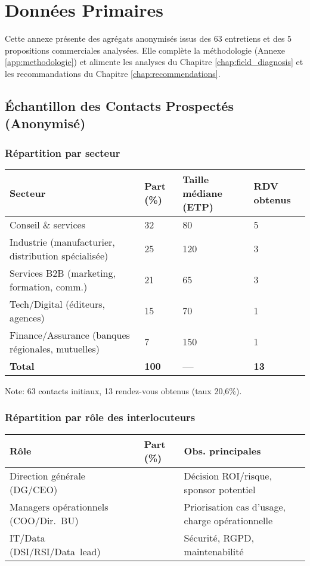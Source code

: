 \chapter{Données Primaires}
\label{app:data}

Cette annexe présente des agrégats anonymisés issus des 63 entretiens et des 5 propositions commerciales analysées. Elle complète la méthodologie (Annexe \ref{app:methodologie}) et alimente les analyses du Chapitre \ref{chap:field_diagnosis} et les recommandations du Chapitre \ref{chap:recommendations}.

\section{Échantillon des Contacts Prospectés (Anonymisé)}
\subsection{Répartition par secteur}
\begin{longtable}{@{}p{6cm}p{3cm}p{3cm}p{3cm}@{}}
\toprule
\textbf{Secteur} & \textbf{Part (\%)} & \textbf{Taille médiane (ETP)} & \textbf{RDV obtenus} \\
\midrule
Conseil \& services & 32 & 80 & 5 \\
Industrie (manufacturier, distribution spécialisée) & 25 & 120 & 3 \\
Services B2B (marketing, formation, comm.) & 21 & 65 & 3 \\
Tech/Digital (éditeurs, agences) & 15 & 70 & 1 \\
Finance/Assurance (banques régionales, mutuelles) & 7 & 150 & 1 \\
\midrule
\textbf{Total} & \textbf{100} & \textbf{—} & \textbf{13} \\
\bottomrule
\end{longtable}
Note: 63 contacts initiaux, 13 rendez-vous obtenus (taux 20,6\%).

\subsection{Répartition par rôle des interlocuteurs}
\begin{longtable}{@{}>{\raggedright\arraybackslash}p{6cm}>{\raggedright\arraybackslash}p{2.5cm}>{\raggedright\arraybackslash}p{5cm}@{}}
\toprule
\textbf{Rôle} & \textbf{Part (\%)} & \textbf{Obs. principales} \\
\midrule
Direction générale (DG/CEO) & 38 & Décision ROI/risque, sponsor potentiel \\
Managers opérationnels (COO/Dir.~BU) & 34 & Priorisation cas d'usage, charge opérationnelle \\
IT/Data (DSI/RSI/Data~lead) & 28 & Sécurité, RGPD, maintenabilité \\
\bottomrule
\end{longtable}

